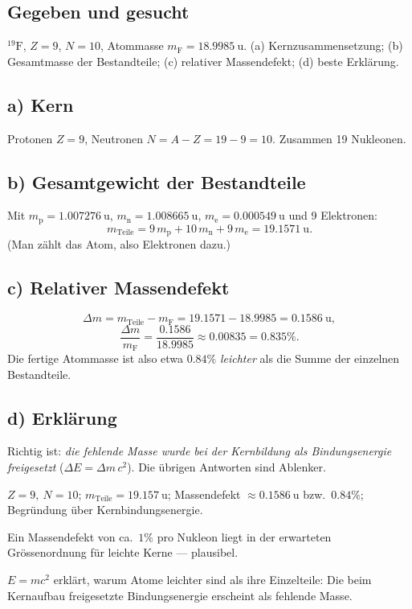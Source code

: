 
\subsection*{Gegeben und gesucht}
${}^{19}\mathrm F$, $Z=9$, $N=10$, Atommasse $m_\text{F}=18.9985\ \mathrm u$.
(a) Kernzusammensetzung; (b) Gesamtmasse der Bestandteile; (c) relativer
Massendefekt; (d) beste Erklärung.

\subsection*{a) Kern}
Protonen $Z=9$, Neutronen $N=A-Z=19-9=10$. Zusammen 19 Nukleonen.

\subsection*{b) Gesamtgewicht der Bestandteile}
Mit $m_\text{p}=1.007276\ \mathrm u$, $m_\text{n}=1.008665\ \mathrm u$,
$m_\text{e}=0.000549\ \mathrm u$ und 9 Elektronen:
\begin{equation}
  m_\text{Teile}=9\,m_\text{p}+10\,m_\text{n}+9\,m_\text{e}
  =19.1571\ \mathrm u .
\end{equation}
(Man zählt das Atom, also Elektronen dazu.)

\subsection*{c) Relativer Massendefekt}
\begin{equation}
  \Delta m = m_\text{Teile}-m_\text{F} = 19.1571 - 18.9985 = 0.1586\ \mathrm u,
\end{equation}
\begin{equation}
  \frac{\Delta m}{m_\text{F}} = \frac{0.1586}{18.9985} \approx 0.00835
  = 0.835\% .
\end{equation}
Die fertige Atommasse ist also etwa $0.84\%$ \emph{leichter} als die Summe
der einzelnen Bestandteile.

\subsection*{d) Erklärung}
Richtig ist: \emph{die fehlende Masse wurde bei der Kernbildung als
Bindungsenergie freigesetzt} ($\Delta E=\Delta m\,c^2$). Die übrigen
Antworten sind Ablenker.

\begin{ergebnis}
$Z{=}9,\ N{=}10$; $m_\text{Teile}=19.157\ \mathrm u$; Massendefekt
$\approx0.1586\ \mathrm u$ bzw.\ $0.84\%$; Begründung über Kernbindungsenergie.
\end{ergebnis}

\begin{kontrolle}
Ein Massendefekt von ca.\ $1\%$ pro Nukleon liegt in der erwarteten
Grössenordnung für leichte Kerne --- plausibel.
\end{kontrolle}

\begin{merksatz}
$E=mc^2$ erklärt, warum Atome leichter sind als ihre Einzelteile: Die beim
Kernaufbau freigesetzte Bindungsenergie erscheint als fehlende Masse.
\end{merksatz}
